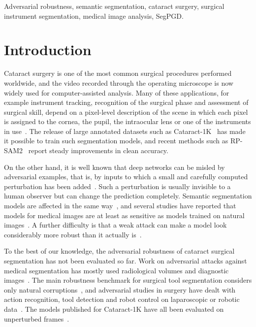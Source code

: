 \documentclass[conference]{IEEEtran}
\begin{document}
\begin{IEEEkeywords}
Adversarial robustness, semantic segmentation, cataract surgery, surgical instrument segmentation, medical image analysis, SegPGD.
\end{IEEEkeywords}

\section{Introduction}

Cataract surgery is one of the most common surgical procedures performed worldwide, and the video recorded through the operating microscope is now widely used for computer-assisted analysis. Many of these applications, for example instrument tracking, recognition of the surgical phase and assessment of surgical skill, depend on a pixel-level description of the scene in which each pixel is assigned to the cornea, the pupil, the intraocular lens or one of the instruments in use~\cite{ghamsarian2024cataract,sinha2025identifying}. The release of large annotated datasets such as Cataract-1K~\cite{ghamsarian2024cataract} has made it possible to train such segmentation models, and recent methods such as RP-SAM2~\cite{zhaksylyk2025rpsam2} report steady improvements in clean accuracy.

On the other hand, it is well known that deep networks can be misled by adversarial examples, that is, by inputs to which a small and carefully computed perturbation has been added~\cite{szegedy2014intriguing,goodfellow2015explaining,madry2018towards}. Such a perturbation is usually invisible to a human observer but can change the prediction completely. Semantic segmentation models are affected in the same way~\cite{xie2017adversarial,arnab2018robustness,gu2022segpgd}, and several studies have reported that models for medical images are at least as sensitive as models trained on natural images~\cite{finlayson2018adversarial,ma2021understanding,bortsova2021adversarial}. A further difficulty is that a weak attack can make a model look considerably more robust than it actually is~\cite{athalye2018obfuscated,croce2023reliable}.

To the best of our knowledge, the adversarial robustness of cataract surgical segmentation has not been evaluated so far. Work on adversarial attacks against medical segmentation has mostly used radiological volumes and diagnostic images~\cite{malik2024evaluating,dietrich2026thyroid,dong2023survey}. The main robustness benchmark for surgical tool segmentation considers only natural corruptions~\cite{ding2024segstrongc}, and adversarial studies in surgery have dealt with action recognition, tool detection and robot control on laparoscopic or robotic data~\cite{cheng2022why,khan2024guardian,jin2026telesurgery}. The models published for Cataract-1K have all been evaluated on unperturbed frames~\cite{ghamsarian2024cataract,zhaksylyk2025rpsam2}.
\end{document}
